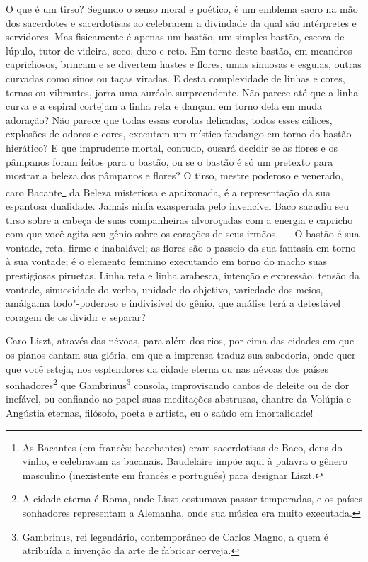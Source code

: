 O que é um tirso? Segundo o senso moral e poético, é
um emblema sacro na mão dos sacerdotes e sacerdotisas ao celebrarem
a divindade da qual são intérpretes e servidores. Mas fisicamente é
apenas um bastão, um simples bastão, escora de lúpulo, tutor de
videira, seco, duro e reto. Em torno deste bastão, em meandros
caprichosos, brincam e se divertem hastes e flores, umas sinuosas e
esguias, outras curvadas como sinos ou taças viradas. E desta complexidade de linhas e cores, ternas ou
vibrantes, jorra uma auréola surpreendente. Não parece até que a linha curva e a espiral cortejam a
linha reta e dançam em torno dela em muda adoração? Não parece que
todas essas corolas delicadas, todos esses cálices, explosões de odores
e cores, executam um místico fandango em torno do bastão hierático? E
que imprudente mortal, contudo, ousará decidir se as flores e os
pâmpanos foram feitos para o bastão, ou se o bastão é só um pretexto
para mostrar a beleza dos pâmpanos e flores? O tirso, mestre poderoso e
venerado, caro Bacante\protect\footnote{  As Bacantes (em francês: bacchantes) eram sacerdotisas de Baco, deus do vinho, e celebravam as
bacanais. Baudelaire impõe aqui à palavra o gênero masculino (inexistente em francês e português) para designar Liszt.} da Beleza misteriosa e
apaixonada, é a
representação da sua espantosa dualidade. Jamais ninfa exasperada pelo invencível Baco sacudiu seu
tirso sobre a cabeça de suas companheiras alvoroçadas com a
energia e capricho com que você agita seu gênio sobre os corações de
seus irmãos. --- O bastão é sua vontade, reta, firme e inabalável; as
flores são o passeio da sua fantasia em torno à sua vontade; é o
elemento feminino executando em torno do macho suas prestigiosas
piruetas. Linha reta e linha arabesca, intenção e expressão, tensão da
vontade, sinuosidade do verbo, unidade do objetivo, variedade dos
meios, amálgama todo"-poderoso e indivisível do gênio, que análise
terá a detestável coragem de os dividir e separar?

Caro Liszt, através das névoas, para além dos rios, por cima das cidades
em que os pianos cantam sua glória, em que a imprensa traduz sua
sabedoria, onde quer que você esteja, nos esplendores da cidade eterna
ou nas névoas dos países sonhadores\protect\footnote{  A cidade eterna é Roma, 
onde Liszt costumava passar temporadas, e os
países sonhadores representam a Alemanha, onde sua música era muito
executada.} que Gambrinus\protect\footnote{  Gambrinus, rei 
legendário, contemporâneo de Carlos Magno, a quem é
atribuída a invenção da arte de fabricar cerveja.}
consola, improvisando cantos de deleite ou
de dor inefável, ou confiando ao papel suas meditações abstrusas,
chantre da Volúpia e Angústia eternas, filósofo, poeta e artista, eu o
saúdo em imortalidade!

